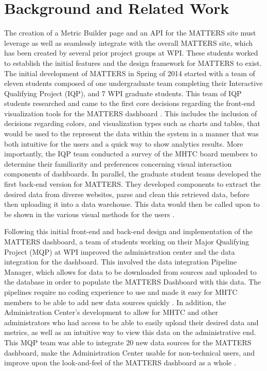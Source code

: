 \chapter{Background and Related Work}

	The creation of a Metric Builder page and an API for the MATTERS site must 
	leverage as well as seamlessly integrate with the overall MATTERS site, 
	which has been created by several prior project groups at WPI. These 
	students worked to establish the initial features and the design framework 
	for MATTERS to exist. The initial development of MATTERS in Spring of 2014 
	started with a team of eleven students composed of one undergraduate team 
	completing their Interactive Qualifying Project (IQP), and 7 WPI graduate 
	students. This team of IQP students researched and came to the first core 
	decisions regarding the front-end visualization tools for the MATTERS 
	dashboard \cite{prevreport}. This includes the inclusion of decisions 
	regarding colors, and visualization types such as charts and tables, that 
	would be used to the represent the data within the system in a manner that 
	was both intuitive for the users and a quick way to show analytics results. 
	More importantly, the IQP team conducted a survey of the MHTC board members 
	to determine their familiarity and preferences concerning visual interaction 
	components of dashboards. In parallel, the graduate student teams developed 
	the first back-end version for MATTERS. They developed components to extract 
	the desired data from diverse websites, parse and clean this retrieved data, 
	before then uploading it into a data warehouse. This data would then be 
	called upon to be shown in the various visual methods for the users 
	\cite{iqp}.

	Following this initial front-end and back-end design and implementation of 
	the MATTERS dashboard, a team of students working on their Major Qualifying 
	Project (MQP) at WPI improved the administration center and the data 
	integration for the dashboard. This involved the data integration Pipeline 
	Manager, which allows for data to be downloaded from sources and uploaded to the database in order to populate the MATTERS Dashboard with this data. The pipelines require no coding experience to use and made it easy for MHTC members to be able to add new data sources quickly \cite{prevreport}. In addition, the Administration Center's development to allow for 
	MHTC and other administrators who had access to be able to easily upload 
	their desired data and metrics, as well as an intuitive way to view this 
	data on the administrative end. This MQP team was able to integrate 20 new 
	data sources for the MATTERS dashboard, make the Administration Center 
	usable for non-technical users, and improve upon the look-and-feel of the 
	MATTERS dashboard as a whole \cite{iqp}.

